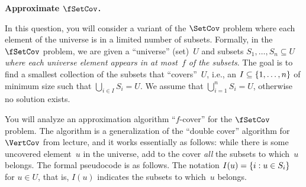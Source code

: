 \documentclass[11pt,addpoints]{exam}
\begin{document}
\begin{questions}

  \question \textbf{Approximate $\fSetCov$.}

  In this question, you will consider a variant of the $\SetCov$ problem where each element of the universe is in a limited number of subsets.
  Formally, in the $\fSetCov$ problem, we are given a ``universe'' (set)~$U$ and subsets $S_1, \ldots, S_n \subseteq U$ \emph{where each universe element appears in at most~$f$ of the subsets}.
  The goal is to find a smallest collection of the subsets that ``covers''~$U$, i.e., an $I \subseteq \{1,\ldots,n\}$ of minimum size such that $\bigcup_{i \in I} S_{i} = U$.
  We assume that $\bigcup_{i=1}^{n} S_{i} = U$, otherwise no solution exists.

  You will analyze an approximation algorithm ``$f$-cover'' for the $\fSetCov$ problem.
  The algorithm is a generalization of the ``double cover'' algorithm for $\VertCov$ from lecture, and it works essentially as follows: while there is some uncovered element~$u$ in the universe, add to the cover \emph{all} the subsets to which~$u$ belongs.
  The formal pseudocode is as follows.
  The notation $I(u) = \{i : u \in S_i\}$ for $u \in U$, that is, $I(u)$ indicates the subsets to which~$u$ belongs.


\end{questions}
\end{document}
